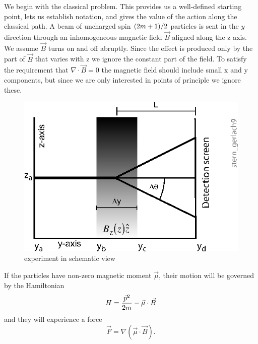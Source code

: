 \documentclass[aps,prl,superscriptaddress,12pt]{revtex4-2}
\begin{document}
We begin with the classical problem. 
This provides us a well-defined starting point, 
	lets us establish notation, 
	and gives the value of the action along the classical path. 
A beam of uncharged spin 
	${{\left( {2m+1} \right)} \mathord{\left/ {\vphantom {{\left( {2m+1} \right)} 2}} \right. \kern-\nulldelimiterspace} 2}$
	particles is sent in the $y$ direction through an inhomogeneous magnetic field 
	${\vec B}$ 
	aligned along the z axis. 
We assume 
	${\vec B}$
	turns on and off abruptly. 
Since the \sg effect is produced only by the part of 
	${\vec B}$
	that varies with z we ignore the constant part of the field. 
To satisfy the requirement that 
	$\nabla \cdot \vec B=0$
	the magnetic field should include small x and y components, 
	but since we are only interested in points of principle we ignore these.

\begin{figure}
\includegraphics{stern_gerlach9_small.eps}
\caption{\label{fig:seqn} {\sg experiment in schematic view}}
\end{figure}

If the particles have non-zero magnetic moment $\vec \mu$, their motion will be governed by the Hamiltonian
\begin{equation}
	H={{\vec p^2} \over {2m}}-\vec \mu \cdot \vec B
\end{equation}
	and they will experience a force
\begin{equation}
\vec F=\nabla \left( {\vec \mu \cdot \vec B} \right).
\end{equation}
\end{document}

